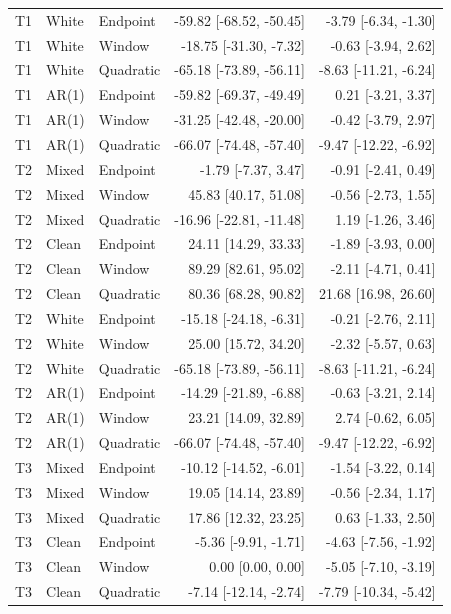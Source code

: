 \documentclass[10pt]{article}
\begin{document}
\begin{longtable}{lllrr}
T1 & White & Endpoint & -59.82 [-68.52, -50.45] & -3.79 [-6.34, -1.30] \\
T1 & White & Window & -18.75 [-31.30, -7.32] & -0.63 [-3.94, 2.62] \\
T1 & White & Quadratic & -65.18 [-73.89, -56.11] & -8.63 [-11.21, -6.24] \\
T1 & AR(1) & Endpoint & -59.82 [-69.37, -49.49] & 0.21 [-3.21, 3.37] \\
T1 & AR(1) & Window & -31.25 [-42.48, -20.00] & -0.42 [-3.79, 2.97] \\
T1 & AR(1) & Quadratic & -66.07 [-74.48, -57.40] & -9.47 [-12.22, -6.92] \\
T2 & Mixed & Endpoint & -1.79 [-7.37, 3.47] & -0.91 [-2.41, 0.49] \\
T2 & Mixed & Window & 45.83 [40.17, 51.08] & -0.56 [-2.73, 1.55] \\
T2 & Mixed & Quadratic & -16.96 [-22.81, -11.48] & 1.19 [-1.26, 3.46] \\
T2 & Clean & Endpoint & 24.11 [14.29, 33.33] & -1.89 [-3.93, 0.00] \\
T2 & Clean & Window & 89.29 [82.61, 95.02] & -2.11 [-4.71, 0.41] \\
T2 & Clean & Quadratic & 80.36 [68.28, 90.82] & 21.68 [16.98, 26.60] \\
T2 & White & Endpoint & -15.18 [-24.18, -6.31] & -0.21 [-2.76, 2.11] \\
T2 & White & Window & 25.00 [15.72, 34.20] & -2.32 [-5.57, 0.63] \\
T2 & White & Quadratic & -65.18 [-73.89, -56.11] & -8.63 [-11.21, -6.24] \\
T2 & AR(1) & Endpoint & -14.29 [-21.89, -6.88] & -0.63 [-3.21, 2.14] \\
T2 & AR(1) & Window & 23.21 [14.09, 32.89] & 2.74 [-0.62, 6.05] \\
T2 & AR(1) & Quadratic & -66.07 [-74.48, -57.40] & -9.47 [-12.22, -6.92] \\
T3 & Mixed & Endpoint & -10.12 [-14.52, -6.01] & -1.54 [-3.22, 0.14] \\
T3 & Mixed & Window & 19.05 [14.14, 23.89] & -0.56 [-2.34, 1.17] \\
T3 & Mixed & Quadratic & 17.86 [12.32, 23.25] & 0.63 [-1.33, 2.50] \\
T3 & Clean & Endpoint & -5.36 [-9.91, -1.71] & -4.63 [-7.56, -1.92] \\
T3 & Clean & Window & 0.00 [0.00, 0.00] & -5.05 [-7.10, -3.19] \\
T3 & Clean & Quadratic & -7.14 [-12.14, -2.74] & -7.79 [-10.34, -5.42] \\

\end{longtable}
\end{document}
